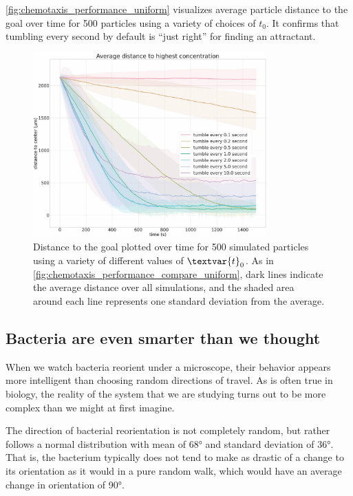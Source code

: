 \autoref{fig:chemotaxis_performance_uniform} visualizes average particle distance to the goal over time for 500 particles using a variety of choices of $t_0$. It confirms that tumbling every second by default is ``just right'' for finding an attractant.\\

\begin{figure}[h]
\centering
\mySfFamily
\includegraphics[width = 0.8\textwidth]{../images_CMYK/chemotaxis_performance_uniform}
\caption{Distance to the goal plotted over time for 500 simulated particles using a variety of different values of $\textvar{t}_\text{0}$. As in \autoref{fig:chemotaxis_performance_compare_uniform}, dark lines indicate the average distance over all simulations, and the shaded area around each line represents one standard deviation from the average.}
\label{fig:chemotaxis_performance_uniform}
\end{figure}

\subsection{Bacteria are even smarter than we thought}

When we watch bacteria reorient under a microscope, their behavior appears more intelligent than choosing random directions of travel. As is often true in biology, the reality of the system that we are studying turns out to be more complex than we might at first imagine.

The direction of bacterial reorientation is not completely random, but rather follows a normal distribution with mean of 68° and standard deviation of 36°. That is, the bacterium typically does not tend to make as drastic of a change to its orientation as it would in a pure random walk, which would have an average change in orientation of 90°.

